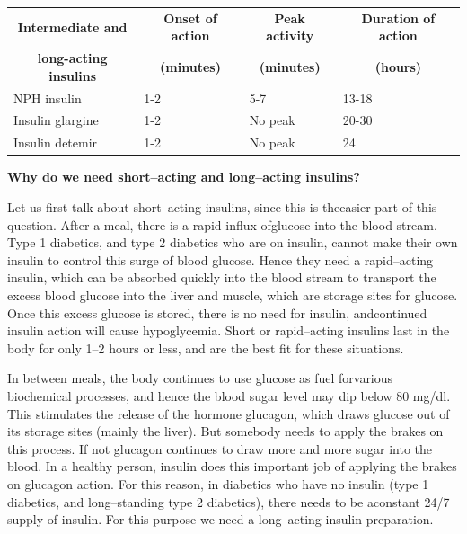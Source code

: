 {
\begin{center}
\small\addtolength{\tabcolsep}{-4pt}
\begin{tabular}{|l|l|l|l|}
\hline
\multicolumn{1}{|c|}{\textbf{Intermediate and}} & \multicolumn{1}{c|}{\textbf{Onset of action}} & \multicolumn{1}{c|}{\textbf{Peak activity}} & \multicolumn{1}{c|}{\textbf{Duration of action}}\\
\multicolumn{1}{|c|}{\textbf{long-acting insulins}} & \multicolumn{1}{c|}{\textbf{(minutes)}} & \multicolumn{1}{c|}{\textbf{(minutes)}} & \multicolumn{1}{c|}{\textbf{(hours)}}\\
\hline
NPH insulin & 1-2 & 5-7 & 13-18\\
\hline
Insulin glargine & 1-2 & No peak & 20-30\\
\hline
Insulin detemir & 1-2 & No peak & 24\\
\hline
\end{tabular}
\end{center}
}\relax

\noindent\textbf{Why do we need short–acting and long–acting insulins?}

Let us first talk about short–acting insulins, since this is the\break easier part of this question. After a meal, there is a rapid influx of\break glucose into the blood stream. Type 1 diabetics, and type 2 diabetics who are on insulin, cannot make their own insulin to control this surge of blood glucose. Hence they need a rapid–acting insulin, which can be absorbed quickly into the blood stream to transport the excess blood glucose into the liver and muscle, which are storage sites for glucose. Once this excess glucose is stored, there is no need for insulin, and\break continued insulin action will cause hypoglycemia. Short or rapid–\break acting insulins last in the body for only 1–2 hours or less, and are the best fit for these situations.

In between meals, the body continues to use glucose as fuel for\break various biochemical processes, and hence the blood sugar level may dip below 80 mg/dl. This stimulates the release of the hormone gluca\-gon, which draws glucose out of its storage sites (mainly the liver). But somebody needs to apply the brakes on this process. If not glucagon continues to draw more and more sugar into the blood. In a healthy person, insulin does this important job of applying the brakes on gluca\-gon action. For this reason, in diabetics who have no insulin (type 1 diabetics, and long–standing type 2 diabetics), there needs to be a\break constant 24/7 supply of insulin. For this purpose we need a long–acting insulin preparation.

